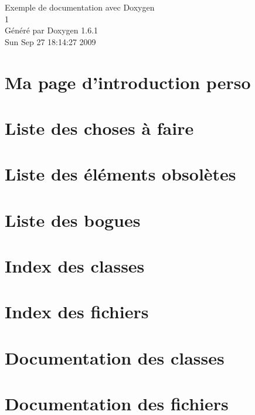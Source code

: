 \documentclass[a4paper]{book}
\begin{document}
\hypersetup{pageanchor=false}
\begin{titlepage}
\vspace*{7cm}
\begin{center}
{\Large Exemple de documentation avec Doxygen \\[1ex]\large 1 }\\
\vspace*{1cm}
{\large Généré par Doxygen 1.6.1}\\
\vspace*{0.5cm}
{\small Sun Sep 27 18:14:27 2009}\\
\end{center}
\end{titlepage}
\clearemptydoublepage
{}
\tableofcontents
\clearemptydoublepage
{}
\hypersetup{pageanchor=true}
\chapter{Ma page d'introduction perso}
\label{index}\hypertarget{index}{}
\chapter{Liste des choses à faire}
\label{todo}
\hypertarget{todo}{}

\chapter{Liste des éléments obsolètes}
\label{deprecated}
\hypertarget{deprecated}{}

\chapter{Liste des bogues}
\label{bug}
\hypertarget{bug}{}

\chapter{Index des classes}

\chapter{Index des fichiers}

\chapter{Documentation des classes}



\chapter{Documentation des fichiers}




\printindex
\end{document}
